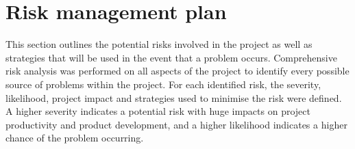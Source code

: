 \documentclass{article}
\begin{document}
\begin{adjustwidth}{0em}{0pt}
\begin{comment}
\begin{description}[style=unboxed,leftmargin=0cm]
\item[Project Manager:] The project manager is responsible for managing the overall schedule and progress of the project. They are also responsible for risk management which involves identifying, minimizing and handling risks within the project.
\item[Design Manager:] The design manager is responsible for handling the design of our software implementation, as well as providing feedback on the physical design of the Rover.
\item[Documentation Manager:] Documentation manager is responsible for organizing any documents related to the project, and ensuring consistent styles are used throughout this project. Any issues to do with documentation are given the final say by the documentation manager. 
\item[Test Manager:] The test manager is responsible for managing the testing and verification of the rover to ensure that it meets the client's requirements. They will oversee JUnit testing code and ensure it's quality.
\item[Quality Assurance Manager:] The quality assurance (QA) manager is responsible for ensuring consistent quality in coding style and will provide feedback on pull requests. Any issues or questions regarding the GitHub repository are directed to the QA manager.
\item[Requirements Manager:] The requirements manager is responsible for handling requirements and making sure that they are taken into account during the product's development. They are also responsible for handling any new requirements and working with the design manager and project manager to make sure they fit in with the user's needs. 
\item[UI/Hardware Manager:] The UI/Hardware manager is responsible for managing the implementation of the UI which includes design and having the say on any changes to be made, and the physical design of our prototype rover.\\
\end{comment}


\end{adjustwidth}

\section{Risk management plan}
This section outlines the potential risks involved in the project as well as strategies that will be used in the event that a problem occurs. Comprehensive risk analysis was performed on all aspects of the project to identify every possible source of problems within the project. For each identified risk, the severity, likelihood, project impact and strategies used to minimise the risk were defined. A higher severity indicates a potential risk with huge impacts on project productivity and product development, and a higher likelihood indicates a higher chance of the problem occurring.
\end{document}
